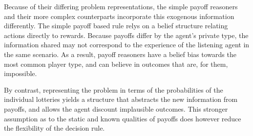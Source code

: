 Because of their differing problem representations, the simple payoff reasoners and their more complex counterparts incorporate this exogenous information differently. The simple payoff based rule relys on a belief structure relating actions directly to rewards. Because payoffs differ by the agent's private type, the information shared may not correspond to the experience of the listening agent in the same scenario. As a result, payoff reasoners have a belief bias towards the most common player type, and can believe in outcomes that are, for them, impossible.

By contrast, representing the problem in terms of the probabilities of the individual lotteries yields a structure that abstracts the new information from payoffs, and allows the agent discount implausible outcomes. This stronger assumption as to the static and known qualities of payoffs does however reduce the flexibility of the decision rule.
